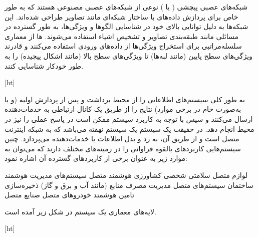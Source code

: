 
\label{فصل۲:مفاهیم اولیه}

شبکه‌های عصبی پیچشی ( یا ) نوعی از شبکه‌های عصبی مصنوعی هستند که به طور خاص برای پردازش داده‌های با ساختار شبکه‌ای مانند تصاویر طراحی شده‌اند. این شبکه‌ها به دلیل توانایی بالای خود در شناسایی الگوها و ویژگی‌ها، به طور گسترده در مسائلی مانند طبقه‌بندی تصاویر  و تشخیص اشیاء استفاده می‌شوند. ها از معماری سلسله‌مراتبی برای استخراج ویژگی‌ها از داده‌های ورودی استفاده می‌کنند و قادرند ویژگی‌های سطح پایین (مانند لبه‌ها) تا ویژگی‌های سطح بالا (مانند اشکال پیچیده) را به طور خودکار شناسایی کنند.



[ht]





به طور کلی سیستم‌های  اطلاعاتی را از محیط برداشت و پس از پردازش اولیه (و یا به‌صورت خام در برخی موارد) نتایج را از طریق یک کانال ارتباطی به خدمات‌دهنده ارسال می‌کنند و سپس با توجه به کاربرد سیستم ممکن است در پاسخ عملی را نیز در محیط انجام دهد. در حقیقت یک سیستم  یک سیستم نهفته می‌باشد که به شبکه اینترنت متصل است و از طریق آن، به رد و بدل اطلاعات با خدمات‌دهنده می‌پردازد. چنین سیستم‌هایی کاربردهای بالقوه فراوانی را در زمینه‌های مختلف دارند که می‌توان به موارد زیر به عنوان برخی از کاربردهای گسترده آن اشاره نمود:


 لوازم متصل سلامتی شخصی
 کشاورزی هوشمند متصل
 سیستم‌های مدیریت هوشمند ساختمان
 سیستم‌های متصل مدیریت مصرف منابع (مانند آب و برق و گاز)
 ذخیره‌سازی تامین هوشمند
 خودروهای متصل
 صنایع متصل


لایه‌های معماری یک سیستم  در شکل زیر آمده است.

[ht]
